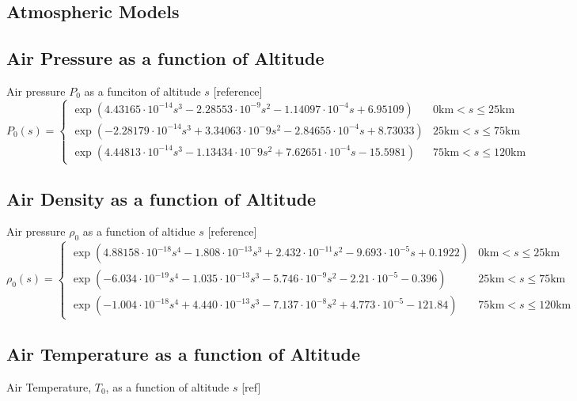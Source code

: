 \documentclass[twocolumn]{article}
\begin{document}
    \onecolumn
    \begin{appendices}
        \section{Atmospheric Models}
            \label{appendix:a}
            \subsection{Air Pressure as a function of Altitude}
                Air pressure $P_0$ as a funciton of altitude $s$ [reference]
                    \[P_0(s)=\begin{cases}
                    \exp{\left(4.43165\cdot10^{-14}s^3-2.28553\cdot10^{-9}s^2-1.14097\cdot10^{-4}s+6.95109\right)} & 0\textrm{km}<s\leq 25\textrm{km}\\
                    \exp{\left(-2.28179\cdot10^{-14}s^3+3.34063\cdot10^-9s^2-2.84655\cdot10^{-4}s+8.73033\right)} & 25\textrm{km} < s \leq 75\textrm{km}\\
                    \exp{\left(4.44813\cdot10^{-14}s^3-1.13434\cdot10^-9s^2+7.62651\cdot10^{-4}s-15.5981\right)} & 75\textrm{km} < s \leq 120\textrm{km}
                \end{cases}\]
            \subsection{Air Density as a function of Altitude}
                Air pressure $\rho_0$ as a function of altidue $s$ [reference]
                \[\rho_0(s)=\begin{cases}
                    \exp{\left(4.88158\cdot10^{-18}s^4-1.808\cdot10^{-13}s^3+2.432\cdot10^{-11}s^2-9.693\cdot10^{-5}s+0.1922\right)} &  0\textrm{km}<s\leq 25\textrm{km}\\
                    \exp{\left(-6.034\cdot10^{-19}s^4-1.035\cdot10^{-13}s^3-5.746\cdot10^{-9}s^2-2.21\cdot10^{-5}-0.396\right)} &  25\textrm{km}<s\leq 75\textrm{km}\\
                    \exp{\left(-1.004\cdot10^{-18}s^4+4.440\cdot10^{-13}s^3-7.137\cdot10^{-8}s^2+4.773\cdot10^{-5}-121.84\right)} &  75\textrm{km}<s\leq 120\textrm{km}
                \end{cases}\]
            \subsection{Air Temperature as a function of Altitude}
                Air Temperature, $T_0$, as a function of altitude $s$ [ref]


\end{appendices}
\end{document}
